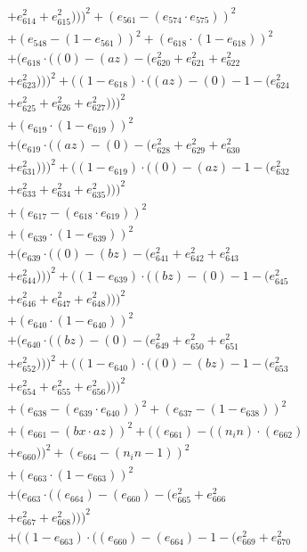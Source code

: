 \documentclass[10pt, a4paper]{article}
\begin{document}
\begin{small}
\begin{align*}
& + e_{614}^{2} + e_{615}^{2})))^{2} + (e_{561} - (e_{574}  \cdot  e_{575}))^{2} \\
& + (e_{548} - (1 - e_{561}))^{2} + (e_{618}  \cdot  (1 - e_{618}))^{2} \\
& + (e_{618}  \cdot  ((0) - (az) - (e_{620}^{2} + e_{621}^{2} + e_{622}^{2} \\
& + e_{623}^{2})))^{2} + ((1 - e_{618})  \cdot  ((az) - (0) - 1 - (e_{624}^{2} \\
& + e_{625}^{2} + e_{626}^{2} + e_{627}^{2})))^{2} \\
& + (e_{619}  \cdot  (1 - e_{619}))^{2} \\
& + (e_{619}  \cdot  ((az) - (0) - (e_{628}^{2} + e_{629}^{2} + e_{630}^{2} \\
& + e_{631}^{2})))^{2} + ((1 - e_{619})  \cdot  ((0) - (az) - 1 - (e_{632}^{2} \\
& + e_{633}^{2} + e_{634}^{2} + e_{635}^{2})))^{2} \\
& + (e_{617} - (e_{618}  \cdot  e_{619}))^{2} \\
& + (e_{639}  \cdot  (1 - e_{639}))^{2} \\
& + (e_{639}  \cdot  ((0) - (bz) - (e_{641}^{2} + e_{642}^{2} + e_{643}^{2} \\
& + e_{644}^{2})))^{2} + ((1 - e_{639})  \cdot  ((bz) - (0) - 1 - (e_{645}^{2} \\
& + e_{646}^{2} + e_{647}^{2} + e_{648}^{2})))^{2} \\
& + (e_{640}  \cdot  (1 - e_{640}))^{2} \\
& + (e_{640}  \cdot  ((bz) - (0) - (e_{649}^{2} + e_{650}^{2} + e_{651}^{2} \\
& + e_{652}^{2})))^{2} + ((1 - e_{640})  \cdot  ((0) - (bz) - 1 - (e_{653}^{2} \\
& + e_{654}^{2} + e_{655}^{2} + e_{656}^{2})))^{2} \\
& + (e_{638} - (e_{639}  \cdot  e_{640}))^{2} + (e_{637} - (1 - e_{638}))^{2} \\
& + (e_{661} - (bx  \cdot  az))^{2} + ((e_{661}) - ((n_in)  \cdot  (e_{662}) \\
& + e_{660}))^{2} + (e_{664} - (n_in - 1))^{2} \\
& + (e_{663}  \cdot  (1 - e_{663}))^{2} \\
& + (e_{663}  \cdot  ((e_{664}) - (e_{660}) - (e_{665}^{2} + e_{666}^{2} \\
& + e_{667}^{2} + e_{668}^{2})))^{2} \\
& + ((1 - e_{663})  \cdot  ((e_{660}) - (e_{664}) - 1 - (e_{669}^{2} + e_{670}^{2} \\

\end{align*}
\end{small}
\end{document}

